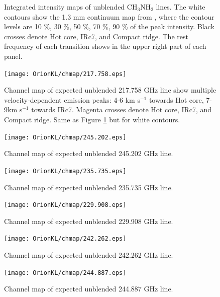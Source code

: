 \begin{figure}[H]
\begin{center}
\label{fig:mom0s}
\caption{Integrated intensity maps of unblended CH$_{3}$NH$_{2}$ lines. 
The white contours show the 1.3 mm continuum map from \citet{Hirota+2015},
where the contour levels are 10 \%, 30 \%, 50 \%, 70 \%, 90 \% of the peak intensity.
Black crosses denote Hot core, IRc7, and Compact ridge. 
The rest frequency of each transition shows in the upper right part of each panel.}
\end{center}
\end{figure}

\begin{figure}[H]
  \centering
  \texttt{[image: OrionKL/chmap/217.758.eps]}
  \caption{
  Channel map of expected unblended 217.758 GHz line show multiple velocity-dependent 
  emission peaks: 4-6 km s$^{-1}$ towards Hot core, 7-9km s$^{-1}$ towards IRc7. 
  Magenta crosses denote Hot core, IRc7, and Compact ridge. Same as Figure \ref{fig:mom0s} but for white contours.}
  \label{ch_0}
\end{figure}

\begin{figure}[H]
  \centering
  \texttt{[image: OrionKL/chmap/245.202.eps]}
  \caption{Channel map of expected unblended 245.202 GHz line.}
  \label{ch_1}
\end{figure}

\begin{figure}[H]
  \centering
  \texttt{[image: OrionKL/chmap/235.735.eps]}
  \caption{Channel map of expected unblended 235.735 GHz line.}
  \label{ch_2}
\end{figure}

\begin{figure}[H]
  \centering
  \texttt{[image: OrionKL/chmap/229.908.eps]}
  \caption{Channel map of expected unblended 229.908 GHz line.}
  \label{ch_3}
\end{figure}

\begin{figure}[H]
  \centering
  \texttt{[image: OrionKL/chmap/242.262.eps]}
  \caption{Channel map of expected unblended 242.262 GHz line.}
  \label{ch_4}
\end{figure}

\begin{figure}[H]
  \centering
  \texttt{[image: OrionKL/chmap/244.887.eps]}
  \caption{Channel map of expected unblended 244.887 GHz line.}
  \label{ch_5}
\end{figure}

\newpage
